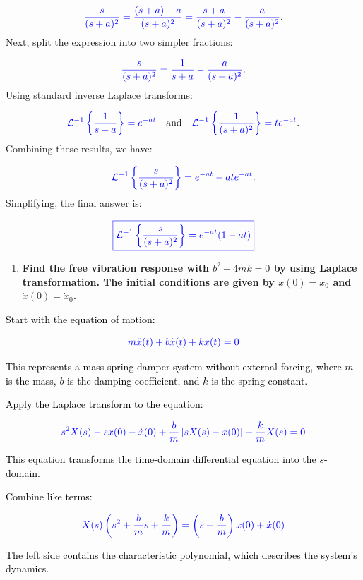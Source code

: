 \documentclass{article}
\begin{document}
\[
	\textcolor{blue}{\frac{s}{(s + a)^2} = \frac{(s + a) - a}{(s + a)^2} = \frac{s + a}{(s + a)^2} - \frac{a}{(s + a)^2}}.
\]
Next, split the expression into two simpler fractions:
	      
\[
	\textcolor{blue}{\frac{s}{(s + a)^2} = \frac{1}{s + a} - \frac{a}{(s + a)^2}}.
\]
Using standard inverse Laplace transforms:
	      
\[
	\textcolor{blue}{\mathcal{L}^{-1}\left\{\frac{1}{s + a}\right\} = e^{-at}} \quad \text{and} \quad \textcolor{blue}{\mathcal{L}^{-1}\left\{\frac{1}{(s + a)^2}\right\} = t e^{-at}}.
\]
Combining these results, we have:
	      
\[
	\textcolor{blue}{\mathcal{L}^{-1}\left\{\frac{s}{(s + a)^2}\right\} = e^{-at} - a t e^{-at}}.
\]
Simplifying, the final answer is:
	      
\[
	\textcolor{blue}{\boxed{\mathcal{L}^{-1}\left\{\frac{s}{(s + a)^2}\right\} = e^{-at} (1 - at)}}
\]
\newpage
\begin{enumerate}
	\item[(c)] \textbf{Find the free vibration response with $b^2 - 4mk = 0$ by using Laplace transformation. The initial conditions are given by $x(0) = x_0$ and $\dot{x}(0) = \dot{x}_0$.}
	      	      
\end{enumerate}
	      
\noindent
\textcolor{black}{Start with the equation of motion:}

\[
	\textcolor{blue}{m\ddot{x}(t) + b\dot{x}(t) + kx(t) = 0}
\]

\noindent
\textcolor{black}{This represents a mass-spring-damper system without external forcing, where \( m \) is the mass, \( b \) is the damping coefficient, and \( k \) is the spring constant.}

\noindent
\textcolor{black}{Apply the Laplace transform to the equation:}

\[
	\textcolor{blue}{s^2X(s) - sx(0) - \dot{x}(0) + \frac{b}{m} \left[sX(s) - x(0)\right] + \frac{k}{m}X(s) = 0}
\]

\noindent
\textcolor{black}{This equation transforms the time-domain differential equation into the \( s \)-domain.}

\noindent
\textcolor{black}{Combine like terms:}

\[
	\textcolor{blue}{X(s) \left( s^2 + \frac{b}{m}s + \frac{k}{m} \right) = \left(s + \frac{b}{m}\right)x(0) + \dot{x}(0)}
\]

\noindent
\textcolor{black}{The left side contains the characteristic polynomial, which describes the system's dynamics.}
\end{document}
